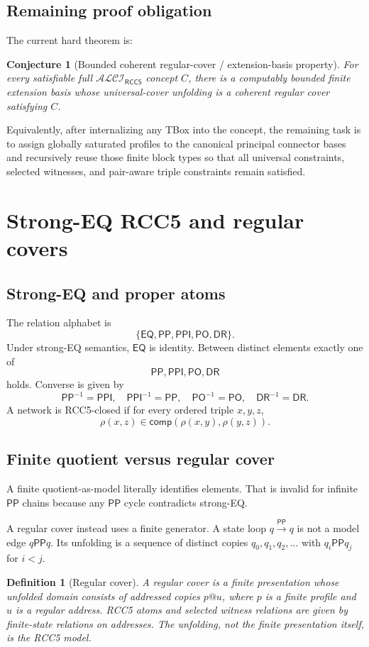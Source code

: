 \documentclass[11pt]{article}
\newtheorem{definition}[theorem]{Definition}
\newtheorem{conjecture}[theorem]{Conjecture}
\newcommand{\EQ}{\mathsf{EQ}}
\newcommand{\PP}{\mathsf{PP}}
\newcommand{\PPI}{\mathsf{PPI}}
\newcommand{\PO}{\mathsf{PO}}
\newcommand{\DR}{\mathsf{DR}}
\newcommand{\comp}{\mathsf{comp}}
\newcommand{\ALCI}{\mathcal{ALCI}_{\mathsf{RCC5}}}
\begin{document}
\subsection{Remaining proof obligation}
The current hard theorem is:

\begin{conjecture}[Bounded coherent regular-cover / extension-basis property]
For every satisfiable full $\ALCI$ concept $C$, there is a computably bounded finite extension basis whose universal-cover unfolding is a coherent regular cover satisfying $C$.
\end{conjecture}

Equivalently, after internalizing any TBox into the concept, the remaining task is to assign globally saturated profiles to the canonical principal connector bases and recursively reuse those finite block types so that all universal constraints, selected witnesses, and pair-aware triple constraints remain satisfied.

\section{Strong-EQ RCC5 and regular covers}

\subsection{Strong-EQ and proper atoms}
The relation alphabet is
\[
\{\EQ,\PP,\PPI,\PO,\DR\}.
\]
Under strong-EQ semantics, $\EQ$ is identity.  Between distinct elements exactly one of
\[
\PP,\PPI,\PO,\DR
\]
holds.  Converse is given by
\[
\PP^{-1}=\PPI,
\quad
\PPI^{-1}=\PP,
\quad
\PO^{-1}=\PO,
\quad
\DR^{-1}=\DR.
\]
A network is RCC5-closed if for every ordered triple $x,y,z$,
\[
\rho(x,z)\in \comp(\rho(x,y),\rho(y,z)).
\]

\subsection{Finite quotient versus regular cover}
A finite quotient-as-model literally identifies elements.  That is invalid for infinite $\PP$ chains because any $\PP$ cycle contradicts strong-EQ.

A regular cover instead uses a finite generator.  A state loop $q\xrightarrow{\PP}q$ is not a model edge $q\PP q$.  Its unfolding is a sequence of distinct copies $q_0,q_1,q_2,\ldots$ with $q_i\PP q_j$ for $i<j$.

\begin{definition}[Regular cover]
A regular cover is a finite presentation whose unfolded domain consists of addressed copies $p@u$, where $p$ is a finite profile and $u$ is a regular address.  RCC5 atoms and selected witness relations are given by finite-state relations on addresses.  The unfolding, not the finite presentation itself, is the RCC5 model.
\end{definition}
\end{document}
